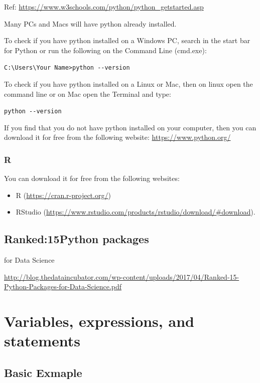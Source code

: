 \documentclass[]{book}
\providecommand{\tightlist}{%
  \setlength{\itemsep}{0pt}\setlength{\parskip}{0pt}}
\begin{document}
Ref: \url{https://www.w3schools.com/python/python_getstarted.asp}

Many PCs and Macs will have python already installed.

To check if you have python installed on a Windows PC, search in the start bar for Python or run the following on the Command Line (cmd.exe):

\texttt{C:\textbackslash{}Users\textbackslash{}Your\ Name\textgreater{}python\ -\/-version}

To check if you have python installed on a Linux or Mac, then on linux open the command line or on Mac open the Terminal and type:

\texttt{python\ -\/-version}

If you find that you do not have python installed on your computer, then you can download it for free from the following website: \url{https://www.python.org/}

\hypertarget{r-3}{%
\subsection{R}\label{r-3}}

You can download it for free from the following websites:

\begin{itemize}
\tightlist
\item
  R (\url{https://cran.r-project.org/})
\item
  RStudio (\url{https://www.rstudio.com/products/rstudio/download/\#download}).
\end{itemize}

\hypertarget{ranked15python-packages}{%
\section{Ranked:15Python packages}\label{ranked15python-packages}}

for Data Science

\url{http://blog.thedataincubator.com/wp-content/uploads/2017/04/Ranked-15-Python-Packages-for-Data-Science.pdf}

\hypertarget{variables-expressions-and-statements}{%
\chapter{Variables, expressions, and statements}\label{variables-expressions-and-statements}}

\hypertarget{basic-exmaple}{%
\section{Basic Exmaple}\label{basic-exmaple}}
\end{document}
